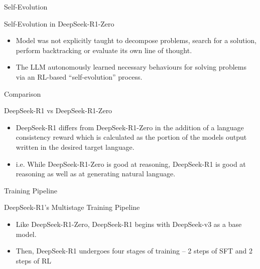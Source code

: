 \begin{frame}[fragile]{Self-Evolution}

Self-Evolution in DeepSeek-R1-Zero

    \begin{itemize}
        \item    Model was not explicitly taught to decompose problems, search for a 
solution, perform backtracking or evaluate its own line of thought. 
        \item   The LLM autonomously learned necessary behaviours for solving 
problems via an RL-based ``self-evolution'' process. 
    \end{itemize}
\end{frame}

\begin{frame}[fragile]{Comparison}

DeepSeek-R1 vs DeepSeek-R1-Zero

    \begin{itemize}
        \item    DeepSeek-R1 differs from DeepSeek-R1-Zero in the addition of a 
language consistency reward which is calculated as the portion of the 
models output written in the desired target language. 
        \item    i.e. While DeepSeek-R1-Zero is good at reasoning, DeepSeek-R1 is good 
at reasoning as well as at generating natural language.
    \end{itemize}
\end{frame}


\begin{frame}[fragile]{ Training Pipeline}

DeepSeek-R1's Multistage Training Pipeline

    \begin{itemize}
        \item     Like DeepSeek-R1-Zero, DeepSeek-R1 begins with DeepSeek-v3 as a 
base model. 
        \item     Then, DeepSeek-R1 undergoes four stages of training – 2 steps of SFT 
and 2 steps of RL
    \end{itemize}
\end{frame}

